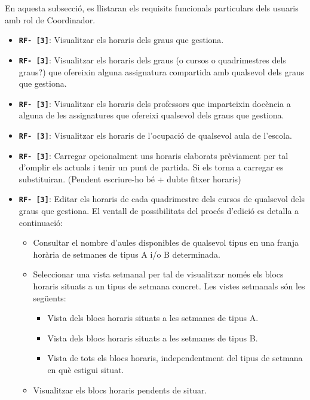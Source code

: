 \documentclass[a4paper,12pt]{ThesisStyle}
\begin{document}
En aquesta subsecció, es llistaran els requisits funcionals particulars dels usuaris amb rol de Coordinador.

\begin{itemize}
  \item \texttt{\textbf{RF- [3]}}: Visualitzar els horaris dels graus que gestiona.
  \item \texttt{\textbf{RF- [3]}}: Visualitzar els horaris dels graus (o cursos o quadrimestres dels graus?) que ofereixin alguna assignatura compartida amb qualsevol dels graus que gestiona.
  \item \texttt{\textbf{RF- [3]}}: Visualitzar els horaris dels professors que imparteixin docència a alguna de les assignatures que ofereixi qualsevol dels graus que gestiona.
  \item \texttt{\textbf{RF- [3]}}: Visualitzar els horaris de l'ocupació de qualsevol aula de l'escola.
  \item \texttt{\textbf{RF- [3]}}: Carregar opcionalment uns horaris elaborats prèviament per tal d'omplir els actuals i tenir un punt de partida. Si els torna a carregar es substituiran. (Pendent escriure-ho bé + dubte fitxer horaris)
  \item \texttt{\textbf{RF- [3]}}: Editar els horaris de cada quadrimestre dels cursos de qualsevol dels graus que gestiona. El ventall de possibilitats del procés d'edició es detalla a continuació:
    \begin{itemize}
      \item Consultar el nombre d'aules disponibles de qualsevol tipus en una franja horària de setmanes de tipus A i/o B determinada.
      \item Seleccionar una vista setmanal per tal de visualitzar només els blocs horaris situats a un tipus de setmana concret. Les vistes setmanals són les següents:
        \begin{itemize}
          \item Vista dels blocs horaris situats a les setmanes de tipus A.
          \item Vista dels blocs horaris situats a les setmanes de tipus B.
          \item Vista de tots els blocs horaris, independentment del tipus de setmana en què estigui situat.
        \end{itemize}
      \item Visualitzar els blocs horaris pendents de situar.
      

\end{itemize}
\end{itemize}
\end{document}
